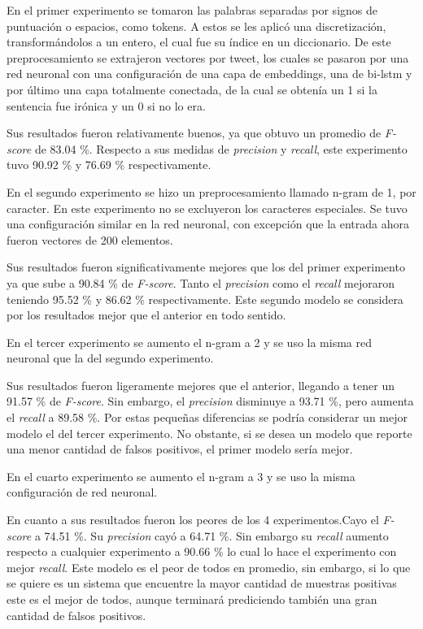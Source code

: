 \par En el primer experimento se tomaron las palabras separadas por signos de puntuación o espacios, como tokens. A estos se les aplicó una discretización, transformándolos a un entero, el cual fue su índice en un diccionario. De este preprocesamiento se extrajeron vectores por tweet, los cuales se pasaron por una red neuronal con una configuración de una capa de embeddings, una de \gls{bi-lstm} y por último una capa totalmente conectada, de la cual se obtenía un 1 si la sentencia fue irónica y un 0 si no lo era.

\par Sus resultados fueron relativamente buenos, ya que obtuvo un promedio de \textit{F-score} de 83.04 \%. Respecto a sus medidas de \textit{precision} y \textit{recall}, este experimento tuvo 90.92 \% y 76.69 \% respectivamente.

\par En el segundo experimento se hizo un preprocesamiento llamado n-gram de 1, por caracter. En este experimento no se excluyeron los caracteres especiales. Se tuvo una configuración similar en la red neuronal, con excepción que la entrada ahora fueron vectores de 200 elementos.

\par Sus resultados fueron significativamente mejores que los del primer experimento ya que sube a 90.84 \% de \textit{F-score}. Tanto el \textit{precision} como el \textit{recall} mejoraron teniendo 95.52 \% y 86.62 \% respectivamente. Este segundo modelo se considera por los resultados mejor que el anterior en todo sentido.

\par En el tercer experimento se aumento el n-gram a 2 y se uso la misma red neuronal que la del segundo experimento.

\par Sus resultados fueron ligeramente mejores que el anterior, llegando a tener un 91.57 \% de \textit{F-score}. Sin embargo, el \textit{precision}
disminuye a 93.71 \%, pero aumenta el \textit{recall} a 89.58 \%. Por estas pequeñas diferencias se podría considerar un mejor modelo el del tercer experimento. No obstante, si se desea un modelo que reporte una menor cantidad de falsos positivos, el primer modelo sería mejor.

\par En el cuarto experimento se aumento el n-gram a 3 y se uso la misma configuración de red neuronal.

\par En cuanto a sus resultados fueron los peores de los 4 experimentos.Cayo el \textit{F-score} a 74.51 \%. Su \textit{precision} cayó a 64.71 \%. Sin embargo su \textit{recall} aumento respecto a cualquier experimento a 90.66 \% lo cual lo hace el experimento con mejor \textit{recall}. Este modelo es el peor de todos en promedio, sin embargo, si lo que se quiere es un sistema que encuentre la mayor cantidad de muestras positivas este es el mejor de todos, aunque terminará prediciendo también una gran cantidad de falsos positivos.

